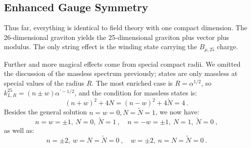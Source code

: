 \subsection*{Enhanced Gauge Symmetry}

Thus far, everything is identical to field theory with one compact dimension. The 26-dimensional graviton yields the 25-dimensional graviton plus vector plus modulus. The only string effect is the winding state carrying the $B_{\mu, 25}$ charge.

Further and more magical effects come from special compact radii. We omitted the discussion of the massless spectrum previously; states are only massless at special values of the radius $R$.
The most enriched case is $R=\alpha^{1 / 2}$, 
so $k_{L, R}^{25}=(n \pm w) \alpha^{\prime-1 / 2}$, and the condition for massless states is:
\begin{equation}
	(n+w)^{2}+4 N=(n-w)^{2}+4 \tilde{N}=4 \:. \label{8.3.8}
\end{equation}
Besides the general solution $n=w=0, N=\tilde{N}=1$, we now have:
\begin{equation}
	n=w=\pm 1,\: N=0,\: \tilde{N}=1\:, \quad n=-w=\pm 1, \: N=1, \:\tilde{N}=0 \:, \label{8.3.9}
\end{equation}
as well as:
\begin{equation}
	n=\pm 2,\: w=N=\tilde{N}=0\:, \quad w=\pm 2, \: n=N=\tilde{N}=0 \:. \label{8.3.10}
\end{equation}

